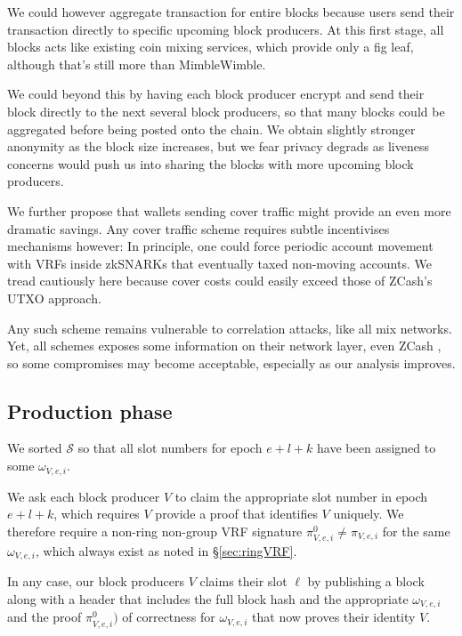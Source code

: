 We could however aggregate transaction for entire blocks because users send their transaction directly to specific upcoming block producers.  At this first stage, all blocks acts like existing coin mixing services, which provide only a fig leaf, although that's still more than MimbleWimble.  

We could beyond this by having each block producer encrypt and send their block directly to the next several block producers, so that many blocks could be aggregated before being posted onto the chain.  We obtain slightly stronger anonymity as the block size increases, but we fear privacy degrads as liveness concerns would push us into sharing the blocks with more upcoming block producers. 

We further propose that wallets sending cover traffic might provide an even more dramatic savings.  Any cover traffic scheme requires subtle incentivises mechanisms however:  In principle, one could force periodic account movement with VRFs inside zkSNARKs that eventually taxed non-moving accounts.  We tread cautiously here because cover costs could easily exceed those of ZCash's UTXO approach.

Any such scheme remains vulnerable to correlation attacks, like all mix networks.  Yet, all schemes exposes some information on their network layer, even ZCash \cite{ZCash_vulnerable_2019}, so some compromises may become acceptable, especially as our analysis improves.  

\subsection{Production phase}\label{subsec:production_phase}

We sorted $\mathcal{S}$ so that all slot numbers for epoch $e+l+k$ have been assigned to some $\omega_{V,e,i}$.  

We ask each block producer $V$ to claim the appropriate slot number in epoch $e+l+k$, which requires $V$ provide a proof that identifies $V$ uniquely.  
We therefore require a non-ring non-group VRF signature $\pi^0_{V,e,i} \ne \pi_{V,e,i}$ for the same $\omega_{V,e,i}$, which always exist as noted in \S\ref{sec:ringVRF}.

In any case, our block producers $V$ claims their slot $\ell$ by publishing a block along with a header that includes the full block hash and the appropriate $\omega_{V,e,i}$ and the proof $\pi^0_{V,e,i})$ of correctness for $\omega_{V,e,i}$ that now proves their identity $V$.  


